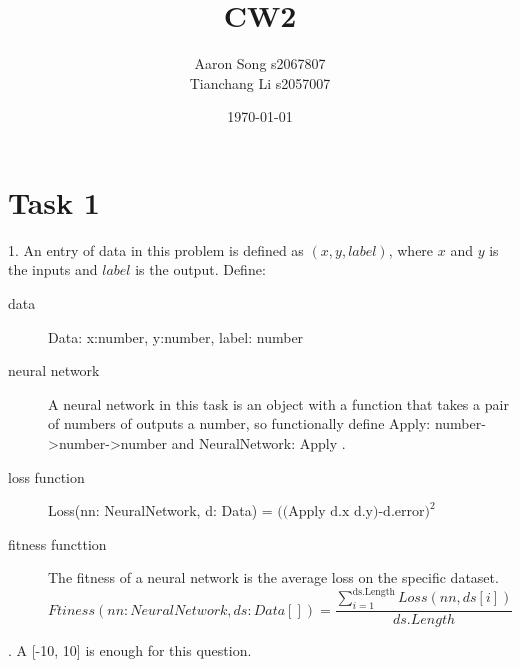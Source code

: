 \documentclass[12pt]{article}
\author{Aaron Song s2067807\\Tianchang Li s2057007}
\title{CW2}
\date{\today}
\begin{document}
\maketitle



\section{Task 1}

1. An entry of data in this problem is defined as $(x,y,label)$, where $x$ and $y$ is the inputs and $label$ is the output. Define:
\begin{description}
    \item[data] Data: x:number, y:number, label: number
    \item[neural network] A neural network in this task is an object with a function that takes a pair of numbers of outputs a number, so functionally define Apply: number->number->number and NeuralNetwork: { Apply }.
    \item[loss function] Loss(nn: NeuralNetwork, d: Data) = $((\textrm{Apply d.x d.y)-d.error)}^2$
    \item[fitness functtion] The fitness of a neural network is the average loss on the specific dataset. $$Ftiness(nn: NeuralNetwork, ds: Data[]) = \frac{\sum_{i=1}^{\textrm{ds.Length}}Loss(nn, ds[i])}{ds.Length}$$
\end{description}

. A [-10, 10] is enough for this question.
\end{document}
